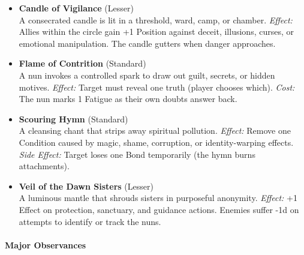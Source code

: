 \documentclass[11pt]{book}
\begin{document}
\begin{itemize}[leftmargin=1.5em]

    \item \textbf{Candle of Vigilance} (Lesser) \\
    A consecrated candle is lit in a threshold, ward, camp, or chamber.  
    \emph{Effect:} Allies within the circle gain +1 Position against deceit,  
    illusions, curses, or emotional manipulation.  
    The candle gutters when danger approaches.

    \item \textbf{Flame of Contrition} (Standard) \\
    A nun invokes a controlled spark to draw out guilt, secrets, or  
    hidden motives.  
    \emph{Effect:} Target must reveal one truth (player chooses which).  
    \emph{Cost:} The nun marks 1 Fatigue as their own doubts answer back.

    \item \textbf{Scouring Hymn} (Standard) \\
    A cleansing chant that strips away spiritual pollution.  
    \emph{Effect:} Remove one Condition caused by magic, shame, corruption,  
    or identity-warping effects.  
    \emph{Side Effect:} Target loses one Bond temporarily (the hymn burns attachments).

    \item \textbf{Veil of the Dawn Sisters} (Lesser) \\
    A luminous mantle that shrouds sisters in purposeful anonymity.  
    \emph{Effect:} +1 Effect on protection, sanctuary, and guidance actions.  
    Enemies suffer -1d on attempts to identify or track the nuns.

\end{itemize}

\paragraph{Major Observances}
\end{document}
